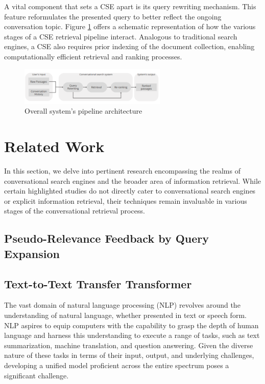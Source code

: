 \documentclass[sigconf]{acmart}
\begin{document}
A vital component that sets a CSE apart is its query rewriting mechanism. This feature reformulates the presented query to better reflect the ongoing conversation topic. Figure \ref{figure:global_pipeline} offers a schematic representation of how the various stages of a CSE retrieval pipeline interact. Analogous to traditional search engines, a CSE also requires prior indexing of the document collection, enabling computationally efficient retrieval and ranking processes.

\begin{figure}[h]
	\includegraphics[width=7cm]{pipeline.png}
	\caption{Overall system's pipeline architecture}
	\label{figure:global_pipeline}
\end{figure}


\section{Related Work}\label{sec:related}
In this section, we delve into pertinent research encompassing the realms of conversational search engines and the broader area of information retrieval. While certain highlighted studies do not directly cater to conversational search engines or explicit information retrieval, their techniques remain invaluable in various stages of the conversational retrieval process.

\subsection*{Pseudo-Relevance Feedback by Query Expansion}\label{sec:prf}

\subsection*{Text-to-Text Transfer Transformer}\label{sec:t5}
The vast domain of natural language processing (NLP) revolves around the understanding of natural language, whether presented in text or speech form. NLP aspires to equip computers with the capability to grasp the depth of human language and harness this understanding to execute a range of tasks, such as text summarization, machine translation, and question answering. Given the diverse nature of these tasks in terms of their input, output, and underlying challenges, developing a unified model proficient across the entire spectrum poses a significant challenge.
\end{document}

